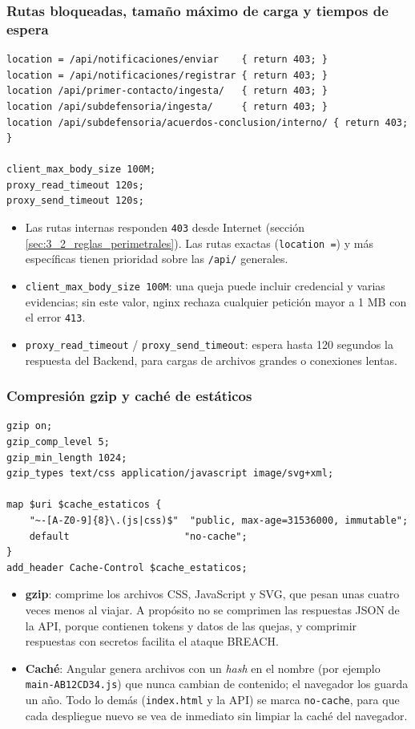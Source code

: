 \subsubsection{Rutas bloqueadas, tamaño máximo de carga y tiempos de espera}
\begin{lstlisting}
location = /api/notificaciones/enviar    { return 403; }
location = /api/notificaciones/registrar { return 403; }
location /api/primer-contacto/ingesta/   { return 403; }
location /api/subdefensoria/ingesta/     { return 403; }
location /api/subdefensoria/acuerdos-conclusion/interno/ { return 403; }

client_max_body_size 100M;
proxy_read_timeout 120s;
proxy_send_timeout 120s;
\end{lstlisting}
\begin{itemize}
  \item Las rutas internas responden \texttt{403} desde Internet (sección \ref{sec:3_2_reglas_perimetrales}). Las rutas exactas (\texttt{location =}) y más específicas tienen prioridad sobre las \texttt{/api/} generales.
  \item \texttt{client\_max\_body\_size 100M}: una queja puede incluir credencial y varias evidencias; sin este valor, nginx rechaza cualquier petición mayor a 1 MB con el error \texttt{413}.
  \item \texttt{proxy\_read\_timeout} / \texttt{proxy\_send\_timeout}: espera hasta 120 segundos la respuesta del Backend, para cargas de archivos grandes o conexiones lentas.
\end{itemize}

\subsubsection{Compresión gzip y caché de estáticos}
\begin{lstlisting}
gzip on;
gzip_comp_level 5;
gzip_min_length 1024;
gzip_types text/css application/javascript image/svg+xml;

map $uri $cache_estaticos {
    "~-[A-Z0-9]{8}\.(js|css)$"  "public, max-age=31536000, immutable";
    default                    "no-cache";
}
add_header Cache-Control $cache_estaticos;
\end{lstlisting}
\begin{itemize}
  \item \textbf{gzip}: comprime los archivos CSS, JavaScript y SVG, que pesan unas cuatro veces menos al viajar. A propósito no se comprimen las respuestas JSON de la API, porque contienen tokens y datos de las quejas, y comprimir respuestas con secretos facilita el ataque BREACH.
  \item \textbf{Caché}: Angular genera archivos con un \emph{hash} en el nombre (por ejemplo \texttt{main-AB12CD34.js}) que nunca cambian de contenido; el navegador los guarda un año. Todo lo demás (\texttt{index.html} y la API) se marca \texttt{no-cache}, para que cada despliegue nuevo se vea de inmediato sin limpiar la caché del navegador.
\end{itemize}

